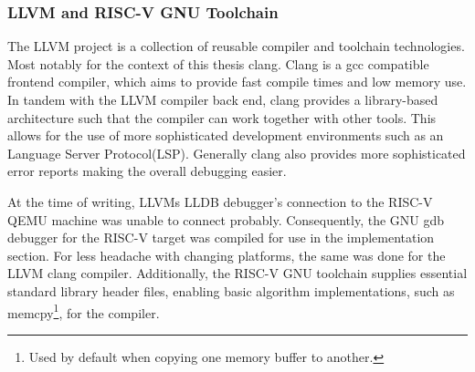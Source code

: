 \subsubsection*{LLVM and RISC-V GNU Toolchain}
The LLVM project is a collection of reusable compiler and toolchain
technologies. Most notably for the context of this thesis clang. Clang is a gcc
compatible frontend compiler, which aims to provide fast compile times and low
memory use. In tandem with the LLVM compiler back end, clang provides a
library-based architecture such that the compiler can work together with other
tools. This allows for the use of more sophisticated development environments
such as an Language Server Protocol(LSP). Generally clang also provides more
sophisticated error reports making the overall debugging easier.

At the time of writing, LLVMs LLDB debugger's connection to the RISC-V QEMU
machine was unable to connect probably. Consequently, the GNU gdb debugger for
the RISC-V target was compiled for use in the implementation section. For less
headache with changing platforms, the same was done for the LLVM clang compiler.
Additionally, the RISC-V GNU toolchain supplies essential standard library
header files, enabling basic algorithm implementations, such as
memcpy\footnote{Used by default when copying one memory buffer to another.}, for the
compiler.

